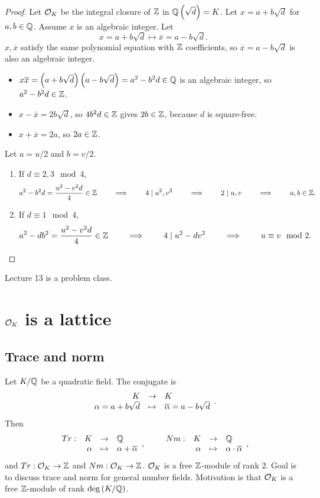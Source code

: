 \begin{proof}
Let $ \mathcal{O}_K $ be the integral closure of $ \mathbb{Z} $ in $ \mathbb{Q}\left( \sqrt{d} \right) = K $. Let $ x = a + b\sqrt{d} $ for $ a, b \in \mathbb{Q} $. Assume $ x $ is an algebraic integer. Let
$$ x = a + b\sqrt{d} \mapsto \overline{x} = a - b\sqrt{d}. $$
$ x, \overline{x} $ satisfy the same polynomial equation with $ \mathbb{Z} $ coefficients, so $ \overline{x} = a - b\sqrt{d} $ is also an algebraic integer.
\begin{itemize}
\item $ x\overline{x} = \left( a + b\sqrt{d} \right)\left( a - b\sqrt{d} \right) = a^2 - b^2d \in \mathbb{Q} $ is an algebraic integer, so $ a^2 - b^2d \in \mathbb{Z} $.
\item $ x - \overline{x} = 2b\sqrt{d} $, so $ 4b^2d \in \mathbb{Z} $ gives $ 2b \in \mathbb{Z} $, because $ d $ is square-free.
\item $ x + \overline{x} = 2a $, so $ 2a \in \mathbb{Z} $.
\end{itemize}
Let $ a = u / 2 $ and $ b = v / 2 $.
\begin{enumerate}
\item If $ d \equiv 2, 3 \mod 4 $,
$$ a^2 - b^2d = \dfrac{u^2 - v^2d}{4} \in \mathbb{Z} \qquad \implies \qquad 4 \mid u^2, v^2 \qquad \implies \qquad 2 \mid u, v \qquad \implies \qquad a, b \in \mathbb{Z}. $$
\item If $ d \equiv 1 \mod 4 $,
$$ a^2 - db^2 = \dfrac{u^2 - v^2d}{4} \in \mathbb{Z} \qquad \implies \qquad 4 \mid u^2 - dv^2 \qquad \implies \qquad u \equiv v \mod 2. $$
\end{enumerate}
\end{proof}


Lecture 13 is a problem class.

\pagebreak

\section{$ \mathcal{O}_K $ is a lattice}


\subsection{Trace and norm}

Let $ K / \mathbb{Q} $ be a quadratic field. The conjugate is
$$ \function{K}{K}{\alpha = a + b\sqrt{d}}{\overline{\alpha} = a - b\sqrt{d}}. $$
Then
$$ \function[Tr]{K}{\Q}{\alpha}{\alpha + \overline{\alpha}}, \qquad \function[Nm]{K}{\Q}{\alpha}{\alpha \cdot \overline{\alpha}}, $$
and $ Tr : \mathcal{O}_K \to \mathbb{Z} $ and $ Nm : \mathcal{O}_K \to \mathbb{Z} $. $ \mathcal{O}_K $ is a free $ \mathbb{Z} $-module of rank $ 2 $. Goal is to discuss trace and norm for general number fields. Motivation is that $ \mathcal{O}_K $ is a free $ \mathbb{Z} $-module of rank $ \deg\left( K / \mathbb{Q} \right) $.

